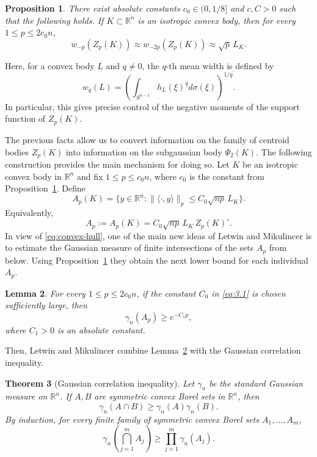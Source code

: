 \documentclass[11pt,leqno]{article}
\newtheorem{theorem}{Theorem}[section]
\newtheorem{lemma}[theorem]{Lemma}
\newtheorem{proposition}[theorem]{Proposition}
\theoremstyle{definition}
\numberwithin{equation}{section}
\newcommand{\ls}{\leqslant}
\newcommand{\gr}{\geqslant}
\newcommand{\R}{\mathbb{R}}
\begin{document}
\begin{proposition}\label{prop:2.4}
There exist absolute constants $c_0 \in (0,1/8]$ and $c,C > 0$ such that the following holds.
If $K \subset \R^n$ is an isotropic convex body, then for every $1 \ls p \ls 2c_0n$,
\[w_{-p}(Z_p(K))\approx w_{-2p}(Z_p(K))\approx \sqrt{p}\,L_K.\]
\end{proposition}

Here, for a convex body $L$ and $q\neq 0$, the $q$-th mean width is defined by
\begin{equation}\label{eq:q-mean-width}w_q(L)=\left(\int_{S^{n-1}}h_L(\xi)^qd\sigma(\xi)\right)^{1/q}.\end{equation}
In particular, this gives precise control of the negative moments of the support function of $Z_p(K)$.

The previous facts allow us to convert information on the family of centroid bodies
$Z_p(K)$ into information on the subgaussian body $\Psi_2(K)$.
The following construction provides the main mechanism for doing so.
Let $K$ be an isotropic convex body in $\mathbb{R}^n$ and fix $1 \ls p \ls c_0n$, where $c_0$ is the constant from Proposition~\ref{prop:2.4}. Define
\begin{equation}\label{eq:3.1}
A_p(K)=\{y \in \R^n : \|\langle \cdot,y\rangle\|_p \ls C_0\sqrt{np}\,L_K\}.
\end{equation}
Equivalently,
\[A_p:=A_p(K) = C_0\sqrt{np}\,L_K\,Z_p(K)^\circ.\]
In view of \eqref{eq:convex-hull}, one of the main new ideas of Letwin and Mikulincer \cite{Letwin-Mikulincer-2026} is to 
estimate the Gaussian measure of finite intersections of the sets $A_p$ from below. Using Proposition~\ref{prop:2.4} they obtain
the next lower bound for each individual $A_p$.

\begin{lemma}\label{lem:2.6}
For every $1 \ls p \ls 2c_0n$, if the constant $C_0$ in \eqref{eq:3.1} is chosen sufficiently large, then
\[\gamma_n(A_p) \gr e^{-C_1p},\]
where $C_1>0$ is an absolute constant.
\end{lemma}

Then, Letwin and Mikulincer combine Lemma~\ref{lem:2.6} with the Gaussian correlation inequality.

\begin{theorem}[Gaussian correlation inequality]\label{th:2.5}
Let $\gamma_n$ be the standard Gaussian measure on $\R^n$. If $A,B$ are symmetric convex Borel sets in $\mathbb{R}^n$, then
\[\gamma_n(A \cap B) \gr \gamma_n(A)\gamma_n(B).\]
By induction, for every finite family of symmetric convex Borel sets $A_1,\dots,A_m$,
\[\gamma_n\left(\bigcap_{j=1}^m A_j\right)\gr\prod_{j=1}^m \gamma_n(A_j).\]
\end{theorem}
\end{document}
